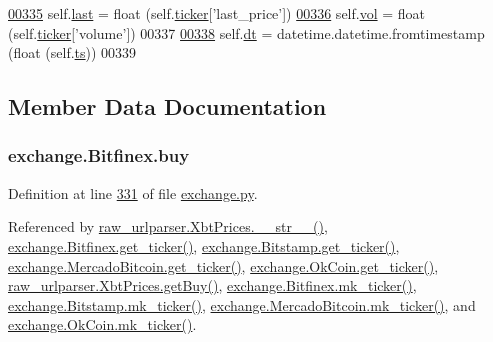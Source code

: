 \begin{DoxyCode}
\hypertarget{classexchange_1_1_bitfinex.tex_l00335}{}\hyperlink{classexchange_1_1_bitfinex_a56e491a27f4b3215b66e13da7796c078}{00335}         self.\hyperlink{classexchange_1_1_bitfinex_a56e491a27f4b3215b66e13da7796c078}{last} = float (self.\hyperlink{classexchange_1_1_exchange_a7cf9e52f993627955a2e242c388daaeb}{ticker}[\textcolor{stringliteral}{'last\_price'}])
\hypertarget{classexchange_1_1_bitfinex.tex_l00336}{}\hyperlink{classexchange_1_1_bitfinex_a278da3a9eab93e256041c988f9bbd54c}{00336}         self.\hyperlink{classexchange_1_1_bitfinex_a278da3a9eab93e256041c988f9bbd54c}{vol}  = float (self.\hyperlink{classexchange_1_1_exchange_a7cf9e52f993627955a2e242c388daaeb}{ticker}[\textcolor{stringliteral}{'volume'}])
00337     
\hypertarget{classexchange_1_1_bitfinex.tex_l00338}{}\hyperlink{classexchange_1_1_bitfinex_adc9e5a19056dcc22e8028e749b233795}{00338}         self.\hyperlink{classexchange_1_1_bitfinex_adc9e5a19056dcc22e8028e749b233795}{dt} = datetime.datetime.fromtimestamp (float (self.\hyperlink{classexchange_1_1_bitfinex_abf872e8ea738acd33d34a00d9d9e92c4}{ts}))
00339     
\end{DoxyCode}


\subsection{Member Data Documentation}
\subsubsection[{\texorpdfstring{buy}{buy}}]{\setlength{\rightskip}{0pt plus 5cm}exchange.\+Bitfinex.\+buy}\hypertarget{classexchange_1_1_bitfinex_aed7ff0d2287aaf4d61985d6f11c23c98}{}\label{classexchange_1_1_bitfinex_aed7ff0d2287aaf4d61985d6f11c23c98}


Definition at line \hyperlink{exchange_8py_source_l00331}{331} of file \hyperlink{exchange_8py_source}{exchange.\+py}.



Referenced by \hyperlink{raw__urlparser_8py_source_l00074}{raw\+\_\+urlparser.\+Xbt\+Prices.\+\_\+\+\_\+str\+\_\+\+\_\+()}, \hyperlink{exchange_8py_source_l00340}{exchange.\+Bitfinex.\+get\+\_\+ticker()}, \hyperlink{exchange_8py_source_l00409}{exchange.\+Bitstamp.\+get\+\_\+ticker()}, \hyperlink{exchange_8py_source_l00543}{exchange.\+Mercado\+Bitcoin.\+get\+\_\+ticker()}, \hyperlink{exchange_8py_source_l00608}{exchange.\+Ok\+Coin.\+get\+\_\+ticker()}, \hyperlink{raw__urlparser_8py_source_l00062}{raw\+\_\+urlparser.\+Xbt\+Prices.\+get\+Buy()}, \hyperlink{exchange_8py_source_l00354}{exchange.\+Bitfinex.\+mk\+\_\+ticker()}, \hyperlink{exchange_8py_source_l00423}{exchange.\+Bitstamp.\+mk\+\_\+ticker()}, \hyperlink{exchange_8py_source_l00557}{exchange.\+Mercado\+Bitcoin.\+mk\+\_\+ticker()}, and \hyperlink{exchange_8py_source_l00622}{exchange.\+Ok\+Coin.\+mk\+\_\+ticker()}.

